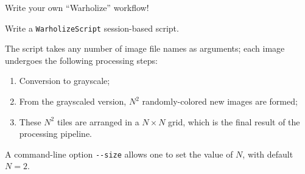 \documentclass[english,serif,mathserif,xcolor=pdftex,dvipsnames,table]{beamer}
\begin{document}
\begin{frame}
  {\small Write your own ``Warholize'' workflow!}

  \small

  \+
  \begin{exercise*}[9.B]
    Write a \texttt{WarholizeScript} session-based script.

    \+
    The script takes any number of image file names as arguments;
    each image undergoes the following processing steps:
    \begin{enumerate}
    \item Conversion to grayscale;
    \item From the grayscaled version, $N^2$ randomly-colored new images are formed;
    \item These $N^2$ tiles are arranged in a $N \times N$ grid, which
      is the final result of the processing pipeline.
    \end{enumerate}

    \+
    A command-line option \texttt{-{}-size} allows one to set the
    value of $N$, with default $N=2$.
  \end{exercise*}
\end{frame}
\end{document}

